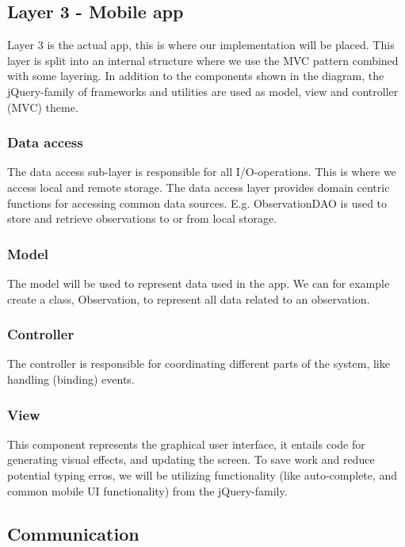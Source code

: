 \subsection{Layer 3 - Mobile app}

Layer 3 is the actual app, this is where our implementation will be placed.
This layer is split into an internal structure where we use the MVC pattern combined
with some layering. In addition to the components shown in the diagram, the
jQuery-family of frameworks and utilities are used as model, view and controller (MVC) theme.

	\subsubsection{Data access}
	
	The data access sub-layer is responsible for all I/O-operations. This is
	where we access local and remote storage. The data access layer provides
	domain centric functions for accessing common data sources. E.g.
	ObservationDAO is used to store and retrieve observations to or from local storage.

	\subsubsection{Model}

	The model will be used to represent data used in the app. We can for example
	create a class, Observation, to represent all data related to an
	observation.

	\subsubsection{Controller}

	The controller is responsible for coordinating different parts of the system,
	like handling (binding) events.

	\subsubsection{View}

	This component represents the graphical user interface, it entails code for
	generating visual effects, and updating the screen. To save work and reduce potential typing erros, we will be
	utilizing functionality (like auto-complete, and common mobile UI
	functionality) from the jQuery-family.

\subsection{Communication}

